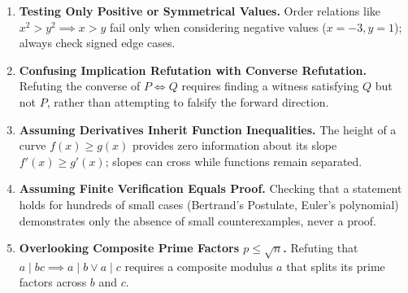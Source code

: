 \documentclass[11pt,a4paper]{article}
\begin{document}
\begin{enumerate}[leftmargin=2em, itemsep=4pt]
  \item \textbf{Testing Only Positive or Symmetrical Values.}
        Order relations like $x^2>y^2 \implies x>y$ fail only when considering negative values ($x=-3, y=1$); always check signed edge cases. 
  \item \textbf{Confusing Implication Refutation with Converse Refutation.}
        Refuting the converse of $P \iff Q$ requires finding a witness satisfying $Q$ but not $P$, rather than attempting to falsify the forward direction. 
  \item \textbf{Assuming Derivatives Inherit Function Inequalities.}
        The height of a curve $f(x) \ge g(x)$ provides zero information about its slope $f'(x) \ge g'(x)$; slopes can cross while functions remain separated. 
  \item \textbf{Assuming Finite Verification Equals Proof.}
        Checking that a statement holds for hundreds of small cases (Bertrand's Postulate, Euler's polynomial) demonstrates only the absence of small counterexamples, never a proof. 
  \item \textbf{Overlooking Composite Prime Factors $p \le \sqrt{n}$.}
        Refuting that $a \mid bc \implies a \mid b \lor a \mid c$ requires a composite modulus $a$ that splits its prime factors across $b$ and $c$. 
\end{enumerate}

\end{document}
